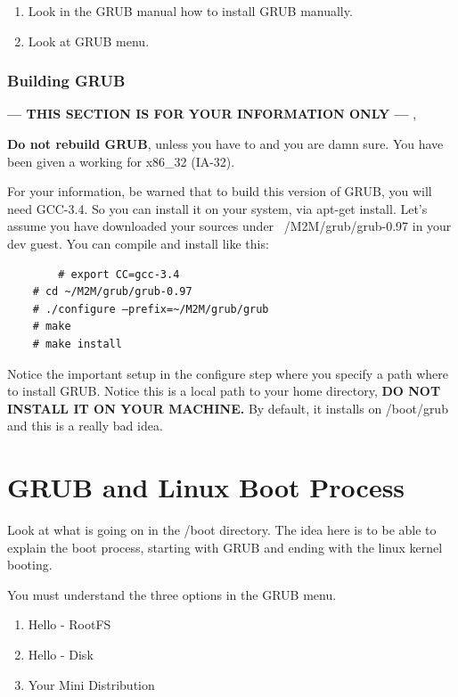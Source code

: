 \documentclass[10]{article}
\begin{document}
\begin{enumerate}
\begin{enumerate}
\end{enumerate}
\item
Look in the GRUB manual how to install GRUB manually.
\item 
Look at GRUB menu.
\end{enumerate}

\subsubsection{Building GRUB}

{\bf --- THIS SECTION IS FOR YOUR INFORMATION ONLY --- },

{\bf Do not rebuild GRUB}, unless you have to and you are damn sure. 
You have been given a working for x86\_32 (IA-32). 

For your information, be warned that to build this version of GRUB, 
you will need GCC-3.4. So you can install it on your system, via apt-get install.
Let's assume you have downloaded your sources under ~/M2M/grub/grub-0.97
in your dev guest. You can compile and install like this:

{\em\small
\begin{verbatim}
        # export CC=gcc-3.4
	# cd ~/M2M/grub/grub-0.97
	# ./configure –prefix=~/M2M/grub/grub
	# make
	# make install 
\end{verbatim}
}

Notice the important setup in the configure step
where you specify a path where to install GRUB.
Notice this is a local path to your home directory,
{\bf DO NOT INSTALL IT ON YOUR MACHINE.}
By default, it installs on /boot/grub
and this is a really bad idea.

\section{GRUB and Linux Boot Process}

Look at what is going on in the /boot directory.
The idea here is to be able to explain the boot process,
starting with GRUB and ending with the linux kernel booting.

You must understand the three options in the GRUB menu.

\begin{enumerate}
\item
Hello - RootFS
\item
Hello - Disk
\item
Your Mini Distribution
\end{enumerate}
\end{document}
